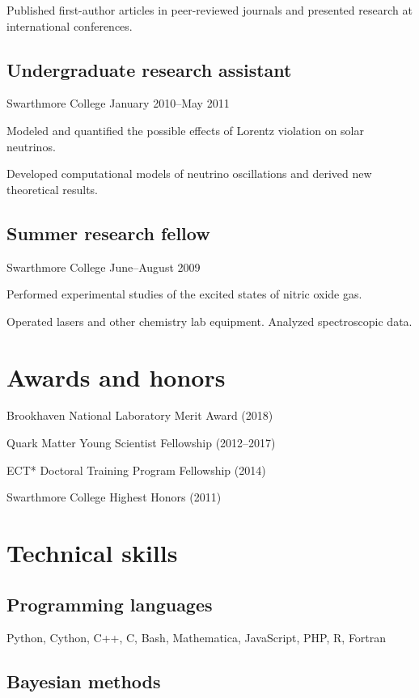 \documentclass[letterpaper,10pt]{article}
\begin{document}
\begin{multicols}{2}
Published first-author articles in peer-reviewed journals and presented research at international conferences.

\subsection{Undergraduate research assistant}
\vspace{-\parskip}
{\small Swarthmore College \hfill January 2010--May 2011}

Modeled and quantified the possible effects of Lorentz violation on solar neutrinos.

Developed computational models of neutrino oscillations and derived new theoretical results.

\subsection{Summer research fellow}
\vspace{-\parskip}
{\small Swarthmore College \hfill June--August 2009}

Performed experimental studies of the excited states of nitric oxide gas.

Operated lasers and other chemistry lab equipment.
Analyzed spectroscopic data.


\section{Awards and honors}

Brookhaven National Laboratory Merit Award (2018)

Quark Matter Young Scientist Fellowship (2012--2017)

ECT* Doctoral Training Program Fellowship (2014)

Swarthmore College Highest Honors (2011)


\columnbreak


\section{Technical skills}

\subsection{Programming languages}

Python, Cython, C++, C, Bash, Mathematica, JavaScript, PHP, R, Fortran

\subsection{Bayesian methods}


\end{multicols}
\end{document}
